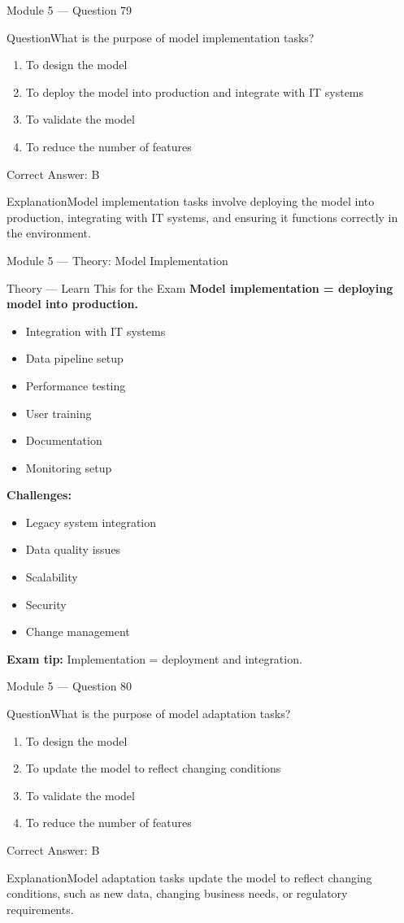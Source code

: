 \documentclass[aspectratio=169,10pt]{beamer}
\newcommand{\question}[1]{\begin{block}{Question}#1\end{block}}
\newcommand{\options}[4]{%
	\begin{enumerate}[label=\Alph*.,leftmargin=*]
		\item #1
		\item #2
		\item #3
		\item #4
	\end{enumerate}
}
\newcommand{\answerbox}[1]{\begin{exampleblock}{Correct Answer: #1}\end{exampleblock}}
\newcommand{\explain}[1]{\begin{block}{Explanation}#1\end{block}}
\newcommand{\theory}[1]{%
	\begin{block}{Theory --- Learn This for the Exam}
		\small #1
	\end{block}
}
\begin{document}
	\begin{frame}{Module 5 --- Question 79}
		\question{What is the purpose of model implementation tasks?}
		\options{To design the model}{To deploy the model into production and integrate with IT systems}{To validate the model}{To reduce the number of features}
		\answerbox{B}
		\explain{Model implementation tasks involve deploying the model into production, integrating with IT systems, and ensuring it functions correctly in the environment.}
	\end{frame}
	
	\begin{frame}{Module 5 --- Theory: Model Implementation}
		\theory{
			\textbf{Model implementation = deploying model into production.}
			\begin{itemize}
				\item Integration with IT systems
				\item Data pipeline setup
				\item Performance testing
				\item User training
				\item Documentation
				\item Monitoring setup
			\end{itemize}
			\textbf{Challenges:}
			\begin{itemize}
				\item Legacy system integration
				\item Data quality issues
				\item Scalability
				\item Security
				\item Change management
			\end{itemize}
			\textbf{Exam tip:} Implementation = deployment and integration.
		}
	\end{frame}
	
	\begin{frame}{Module 5 --- Question 80}
		\question{What is the purpose of model adaptation tasks?}
		\options{To design the model}{To update the model to reflect changing conditions}{To validate the model}{To reduce the number of features}
		\answerbox{B}
		\explain{Model adaptation tasks update the model to reflect changing conditions, such as new data, changing business needs, or regulatory requirements.}
	\end{frame}
	
\end{document}
